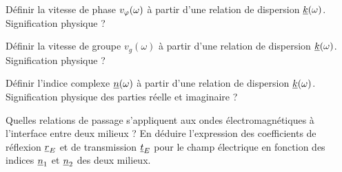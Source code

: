 
      
      \begin{quest}
      \item Définir la vitesse de phase $v_{\varphi}(\omega)$ à partir d'une relation de dispersion $\underline{k}(\omega)$. Signification physique ?
      \ansbox{}
      \item Définir la vitesse de groupe $v_g(\omega)$ à partir d'une relation de dispersion $\underline{k}(\omega)$. Signification physique ?
      \ansbox{}
      \item Définir l'indice complexe $\underline{n}(\omega)$ à partir d'une relation de dispersion $\underline{k}(\omega)$. Signification physique des parties réelle et imaginaire ?
      \ansbox{}
      \item Quelles relations de passage s'appliquent aux ondes électromagnétiques à l'interface entre deux milieux ? En déduire l'expression des coefficients de réflexion $\underline{r}_E$ et de transmission $\underline{t}_E$ pour le champ électrique en fonction des indices $\underline{n}_1$ et $\underline{n}_2$ des deux milieux.
      \ansbox{}
      \end{quest}
      \FIN
      
      
